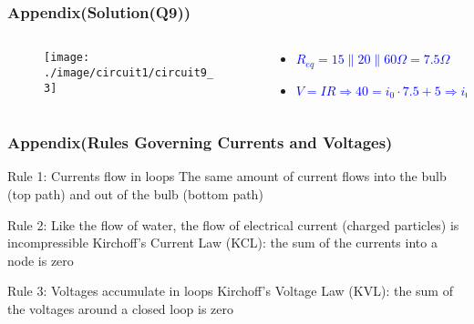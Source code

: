 \documentclass{beamer}
\newcommand{\blue}[1]{\textcolor{blue}{#1}}
\begin{document}
\begin{frame}
\frametitle{Appendix(Solution(Q9))}


\begin{columns}
\begin{column}{6cm}
\begin{figure}[H]
  \texttt{[image: ./image/circuit1/circuit9\_3]}
\end{figure}

\end{column}

\begin{column}{6cm}
\begin{itemize} \itemsep1pt \parskip0pt 
  \item[] \blue{\bf $R_{eq} = 15 \parallel 20 \parallel 60\Omega = 7.5\Omega$}
  \item[] \blue{\bf $V = IR \Rightarrow 40 = i_0 \cdot 7.5 + 5 \Rightarrow i_0 = 3.2A$}
\end{itemize}

\end{column}



\end{columns}


\end{frame}








\begin{frame}
\frametitle{Appendix(Rules Governing Currents and Voltages)}
\begin{block}{Rule 1: Currents flow in loops}
The same amount of current flows into the bulb (top path) and out of the bulb (bottom path)
\end{block}

\begin{block}{Rule 2: Like the flow of water, the flow of electrical
current (charged particles) is incompressible}
Kirchoff’s Current Law (KCL): the sum of the currents into a node is zero
\end{block}

\begin{block}{Rule 3: Voltages accumulate in loops}
Kirchoff’s Voltage Law (KVL): the sum of the voltages around a closed loop is zero
\end{block}
\end{frame}
\end{document}
